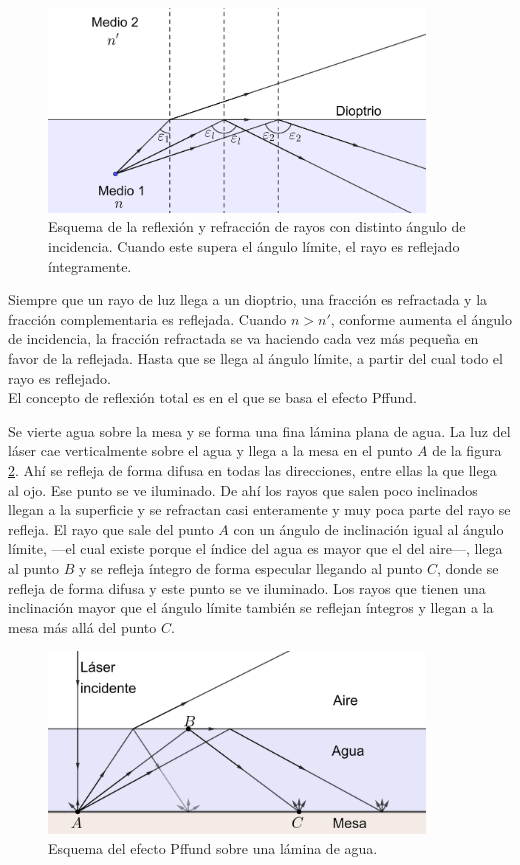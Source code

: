 \documentclass[12pt]{article}
\numberwithin{table}{section}
\numberwithin{figure}{section}
\numberwithin{equation}{section}
\begin{document}
\begin{figure}[!ht]
\begin{center}
\includegraphics[width=10cm]{P2Angulolimite.png}
\caption{Esquema de la reflexión y refracción de rayos con distinto ángulo de incidencia. Cuando este supera el ángulo límite, el rayo es reflejado íntegramente.}
\label{P2figangulolimite}
\end{center}
\end{figure}

Siempre que un rayo de luz llega a un dioptrio, una fracción es refractada y la fracción complementaria es reflejada. Cuando $n>n'$, conforme aumenta el ángulo de incidencia, la fracción refractada se va haciendo cada vez más pequeña en favor de la reflejada. Hasta que se llega al ángulo límite, a partir del cual todo el rayo es reflejado.
\\

El concepto de reflexión total es en el que se basa el efecto Pffund.

Se vierte agua sobre la mesa y se forma una fina lámina plana de agua. La luz del láser cae verticalmente sobre el agua y llega a la mesa en el punto $A$ de la figura \ref{P2PffAgua}. Ahí se refleja de forma difusa en todas las direcciones, entre ellas la que llega al ojo. Ese punto se ve iluminado. De ahí los rayos que salen poco inclinados llegan a la superficie y se refractan casi enteramente y muy poca parte del rayo se refleja. El rayo que sale del punto $A$ con un ángulo de inclinación igual al ángulo límite, ---el cual existe porque el índice del agua es mayor que el del aire---, llega al punto $B$ y se refleja íntegro de forma especular llegando al punto $C$, donde se refleja de forma difusa y este punto se ve iluminado. Los rayos que tienen una inclinación mayor que el ángulo límite también se reflejan íntegros y llegan a la mesa más allá del punto $C$.

\begin{figure}[!ht]
\begin{center}
\includegraphics[width=10cm]{P2PffAgua.png}
\caption{Esquema del efecto Pffund sobre una lámina de agua.}
\label{P2PffAgua}
\end{center}
\end{figure}
\end{document}
